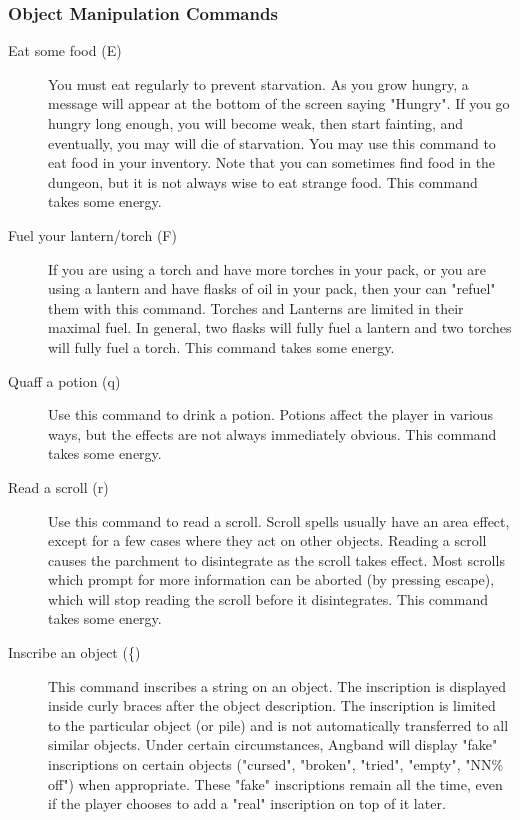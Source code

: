 \subsubsection{Object Manipulation Commands} 
\begin{description}
\item[Eat some food (E)]
  You must eat regularly to prevent starvation. As you grow hungry, a
  message will appear at the bottom of the screen saying "Hungry".  If you
  go hungry long enough, you will become weak, then start fainting, and
  eventually, you may will die of starvation. You may use this command to
  eat food in your inventory. Note that you can sometimes find food in the
  dungeon, but it is not always wise to eat strange food. This command
  takes some energy.

\item[Fuel your lantern/torch (F)]
  If you are using a torch and have more torches in your pack, or you are
  using a lantern and have flasks of oil in your pack, then your can
  "refuel" them with this command. Torches and Lanterns are limited in
  their maximal fuel. In general, two flasks will fully fuel a lantern and
  two torches will fully fuel a torch. This command takes some energy.

\item[Quaff a potion (q)]
  Use this command to drink a potion.  Potions affect the player in
  various ways, but the effects are not always immediately obvious.  This
  command takes some energy.

\item[Read a scroll (r)]
  Use this command to read a scroll. Scroll spells usually have an area
  effect, except for a few cases where they act on other objects.  Reading
  a scroll causes the parchment to disintegrate as the scroll takes
  effect. Most scrolls which prompt for more information can be aborted
  (by pressing escape), which will stop reading the scroll before it
  disintegrates. This command takes some energy.
 
\item[Inscribe an object (\{)]
  This command inscribes a string on an object. The inscription is
  displayed inside curly braces after the object description. The
  inscription is limited to the particular object (or pile) and is not
  automatically transferred to all similar objects.  Under certain
  circumstances, Angband will display "fake" inscriptions on certain
  objects ("cursed", "broken", "tried", "empty", "NN\% off") when
  appropriate. These "fake" inscriptions remain all the time, even if the
  player chooses to add a "real" inscription on top of it later.


\end{description}
